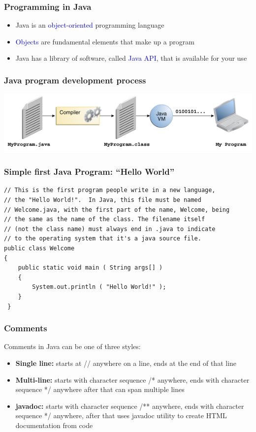 \documentclass{beamer}
\begin{document}
\begin{frame}
  \frametitle{Programming in Java}
	\begin{itemize}
		\item Java is an \textcolor{blue}{object-oriented} programming language \pause
		\item \textcolor{blue}{Objects} are fundamental elements that make up a program \pause
		\item Java has a library of software, called \textcolor{blue}{Java API}, that is available for your use
    \end{itemize}
\end{frame}
\begin{frame}
  \frametitle{Java program development process}
		 \begin{center}
    			\includegraphics[scale=0.55]{images/compilation}
    		 \end{center}
\end{frame}
\begin{frame}[fragile]
  \frametitle{Simple first Java Program: ``Hello World''}
  \vspace{-0.1in}
  {\small{
\begin{verbatim}
// This is the first program people write in a new language, 
// the "Hello World!".  In Java, this file must be named 
// Welcome.java, with the first part of the name, Welcome, being 
// the same as the name of the class. The filename itself 
// (not the class name) must always end in .java to indicate
// to the operating system that it's a java source file.
public class Welcome
{
 	public static void main ( String args[] )
 	{
 	    System.out.println ( "Hello World!" );
 	}
 }
\end{verbatim}
}}
\end{frame}
\begin{frame}
  \frametitle{Comments}
  Comments in Java can be one of three styles:
	\begin{itemize}
		\item \textbf{Single line:} starts at // anywhere on a line, ends at the end of that line
		\item \textbf{Multi-line:} starts with character sequence /* anywhere, ends with character sequence */ anywhere after that can span multiple lines
		\item \textbf{javadoc:} starts with character sequence /** anywhere, ends with character sequence */ anywhere, after that uses javadoc utility to create HTML documentation from code
    \end{itemize}
\end{frame}
\end{document}
